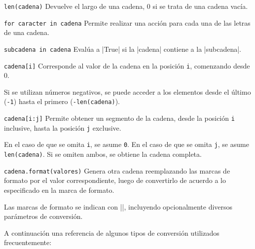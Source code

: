 \begin{referencia_python}

\begin{sintaxis}{\lstinline!len(cadena)!}
Devuelve el largo de una cadena, 0 si se trata de una cadena vacía.
\end{sintaxis}

\begin{sintaxis}{\lstinline!for caracter in cadena!}
Permite realizar una acción para cada una de las letras de una cadena.
\end{sintaxis}

\begin{sintaxis}{\lstinline!subcadena in cadena!}
Evalúa a |True| si la |cadena| contiene a la |subcadena|.
\end{sintaxis}

\begin{sintaxis}{\lstinline!cadena[i]!}
Corresponde al valor de la cadena en la posición \lstinline!i!, comenzando
desde 0.

Si se utilizan números negativos, se puede acceder a los
elementos desde el último (\lstinline!-1!) hasta el primero
(\lstinline!-len(cadena)!).
\end{sintaxis}

\begin{sintaxis}{\lstinline!cadena[i:j]!}
Permite obtener un segmento de la cadena, desde la posición \lstinline!i!
inclusive, hasta la posición \lstinline!j! exclusive.

En el caso de que se omita \lstinline!i!, se asume \lstinline!0!.  En el
caso de que se omita \lstinline!j!, se asume \lstinline!len(cadena)!.  Si
se omiten ambos, se obtiene la cadena completa.
\end{sintaxis}

\begin{sintaxis}{\lstinline!cadena.format(valores)!}
Genera otra cadena reemplazando las marcas de formato por el valor
correspondiente, luego de convertirlo de acuerdo a lo especificado en la
marca de formato.

Las marcas de formato se indican con |{}|, incluyendo opcionalmente
diversos parámetros de conversión.

A continuación una referencia de algunos tipos de conversión utilizados
frecuentemente:


\end{sintaxis}
\end{referencia_python}
